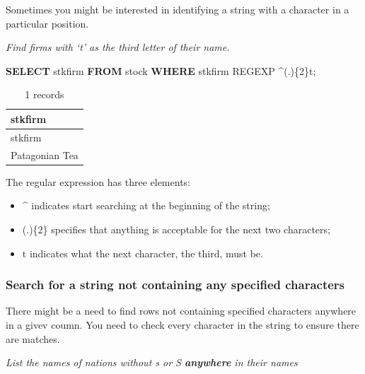 \documentclass[
]{article}
\newenvironment{Shaded}{\begin{snugshade}}{\end{snugshade}}
\newcommand{\KeywordTok}[1]{\textcolor[rgb]{0.13,0.29,0.53}{\textbf{#1}}}
\newcommand{\NormalTok}[1]{#1}
\newcommand{\OperatorTok}[1]{\textcolor[rgb]{0.81,0.36,0.00}{\textbf{#1}}}
\newcommand{\StringTok}[1]{\textcolor[rgb]{0.31,0.60,0.02}{#1}}
\begin{document}
Sometimes you might be interested in identifying a string with a
character in a particular position.

\emph{Find firms with `t' as the third letter of their name.}

\begin{Shaded}
\begin{Highlighting}[]
\KeywordTok{SELECT}\NormalTok{ stkfirm }\KeywordTok{FROM}\NormalTok{ stock }\KeywordTok{WHERE}\NormalTok{ stkfirm REGEXP }\StringTok{\textquotesingle{}\^{}(.)\{2\}t\textquotesingle{}}\NormalTok{;}
\end{Highlighting}
\end{Shaded}

\begin{longtable}[]{@{}l@{}}
\caption{1 records}\tabularnewline
\toprule()
stkfirm \\
\midrule()
\endfirsthead
\toprule()
stkfirm \\
\midrule()
\endhead
Patagonian Tea \\
\bottomrule()
\end{longtable}

The regular expression has three elements:

\begin{itemize}
\item
  \^{} indicates start searching at the beginning of the string;
\item
  (.)\{2\} specifies that anything is acceptable for the next two
  characters;
\item
  t indicates what the next character, the third, must be.
\end{itemize}

\hypertarget{search-for-a-string-not-containing-any-specified-characters}{%
\subsubsection{Search for a string not containing any specified
characters}\label{search-for-a-string-not-containing-any-specified-characters}}

There might be a need to find rows not containing specified characters
anywhere in a givev coumn. You need to check every character in the
string to ensure there are matches.

\emph{List the names of nations without s or S \textbf{anywhere} in
their names}

\begin{Shaded}
\end{Shaded}
\end{document}

